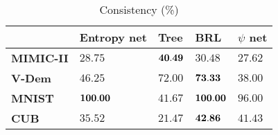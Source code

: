 \begin{table}[t]
\small
\centering
\begin{tabular}{lllll}
\toprule
{} & Entropy net     &              Tree &               BRL &        $\psi$ net\\
\midrule
\textbf{MIMIC-II     } &  $28.75$ &    ${\bf 40.49}$ &   $30.48$ &    $     27.62$ \\
\textbf{V-Dem         }&  $46.25$ &    $72.00$ &   ${\bf 73.33}$ &    $     38.00$ \\
\textbf{MNIST}         &  ${\bf 100.00}$ &   $41.67$ &  ${\bf 100.00}$ &    $96.00$ \\
\textbf{CUB         }  &  $35.52$ &    $21.47$ &   ${\bf 42.86}$ &    $41.43$ \\
\bottomrule
\end{tabular}
\caption{Consistency (\%)}
\label{tab:consistency}
\end{table}




